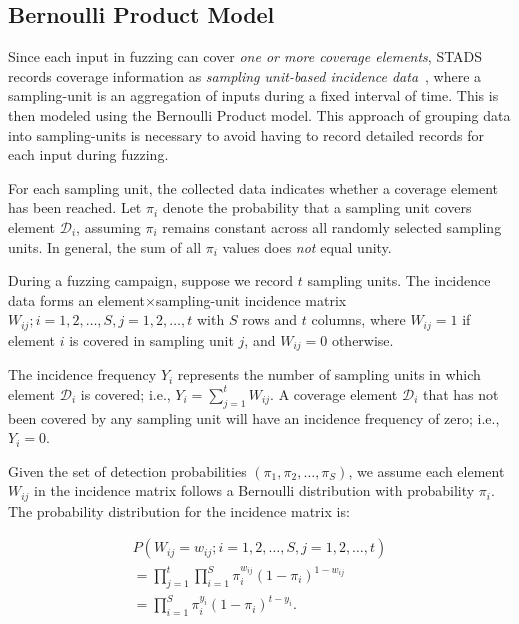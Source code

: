 \documentclass[conference]{IEEEtran}
\begin{document}
\subsection{Bernoulli Product Model}
Since each input in fuzzing can cover \emph{one or more coverage elements},
STADS records coverage information as \emph{sampling unit-based incidence data}~\cite{colwell2012models,Chao_etal:2017}, where a sampling-unit is an aggregation of inputs during a fixed interval of time.
This is then modeled using the Bernoulli Product model.
This approach of grouping data into sampling-units is necessary to avoid having
to record detailed records for each input during fuzzing.

For each sampling unit, the collected data indicates whether a coverage element
has been reached. Let $\pi_i$ denote the probability that a sampling unit covers
element $\mathcal{D}_i$, assuming $\pi_i$ remains constant across all randomly
selected sampling units.
In general, the sum of all $\pi_i$ values does \emph{not} equal unity.

During a fuzzing campaign, suppose we record $t$ sampling units. The incidence data forms an element$\times$sampling-unit incidence matrix ${W_{ij};i=1,2,\dots,S,j=1,2,\dots,t}$ with $S$ rows and $t$ columns, where $W_{ij} = 1$ if element $i$ is covered in sampling unit $j$, and $W_{ij} = 0$ otherwise.

The incidence frequency $Y_i$ represents the number of sampling units in which element $\mathcal{D}_i$ is covered; i.e., $Y_i=\sum_{j=1}^{t}W_{ij}$. A coverage element $\mathcal{D}_i$ that has not been covered by any sampling unit will have an incidence frequency of zero; i.e., $Y_i=0$.

Given the set of detection probabilities $(\pi_1,\pi_2,\dots,\pi_S)$, we assume each element $W_{ij}$ in the incidence matrix follows a Bernoulli distribution with probability $\pi_i$. The probability distribution for the incidence matrix is:

\begin{equation}
    \begin{split}
        P(W_{ij}=w_{ij};i=1,2,\dots,S,j=1,2,\dots,t) \\
        = \prod_{j=1}^{t}\prod_{i=1}^{S}\pi_i^{w_{ij}}(1-\pi_i)^{1-w_{ij}} \\
        = \prod_{i=1}^{S}\pi_i^{y_i}(1-\pi_i)^{t-y_i}.
    \end{split}
\end{equation}
\end{document}
